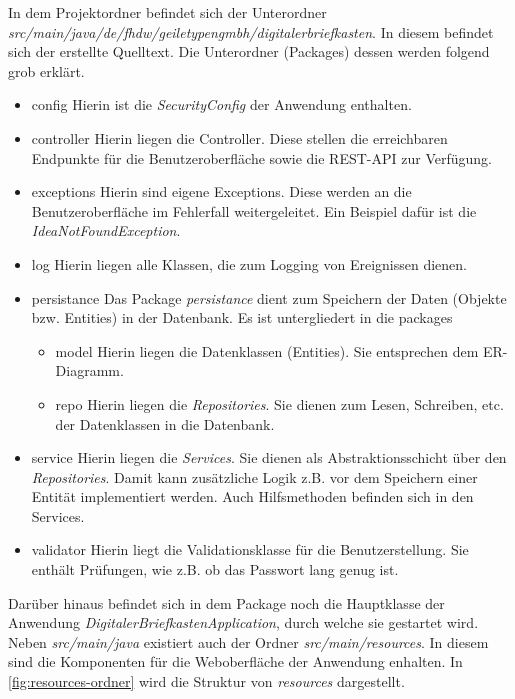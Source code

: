 In dem Projektordner befindet sich der Unterordner \textit{src/main/java/de/fhdw/geiletypengmbh/digitalerbriefkasten}. In diesem
befindet sich der erstellte Quelltext. Die Unterordner (Packages) dessen werden folgend grob erklärt.
\begin{itemize}
    \item config
    \subitem Hierin ist die \textit{SecurityConfig} der Anwendung enthalten.
    \item controller
    \subitem Hierin liegen die Controller. Diese stellen die erreichbaren Endpunkte für die Benutzeroberfläche sowie die REST-API zur Verfügung.
    \item exceptions
    \subitem Hierin sind eigene Exceptions. Diese werden an die Benutzeroberfläche im Fehlerfall weitergeleitet. Ein Beispiel dafür ist die \textit{IdeaNotFoundException}.
    \item log
    \subitem Hierin liegen alle Klassen, die zum Logging von Ereignissen dienen.
    \item persistance
    \subitem Das Package \textit{persistance} dient zum Speichern der Daten (Objekte bzw. Entities) in der Datenbank. Es ist untergliedert
    in die packages
    \begin{itemize}
        \item model
        \subitem Hierin liegen die Datenklassen (Entities). Sie entsprechen dem ER-Diagramm.
        \item repo
        \subitem Hierin liegen die \textit{Repositories}. Sie dienen zum Lesen, Schreiben, etc. der Datenklassen in die Datenbank.
    \end{itemize}
    \item service
    \subitem Hierin liegen die \textit{Services}. Sie dienen als Abstraktionsschicht über den \textit{Repositories}. Damit kann zusätzliche Logik z.B. vor dem Speichern einer Entität implementiert werden. Auch Hilfsmethoden befinden sich in den Services.
    \item validator
    \subitem Hierin liegt die Validationsklasse für die Benutzerstellung. Sie enthält Prüfungen, wie z.B. ob das Passwort lang genug ist.
\end{itemize}
Darüber hinaus befindet sich in dem Package noch die Hauptklasse der Anwendung \textit{DigitalerBriefkastenApplication}, durch welche sie gestartet wird.
\newline
Neben \textit{src/main/java} existiert auch der Ordner \textit{src/main/resources}. In diesem sind die Komponenten für die Weboberfläche der Anwendung enhalten.
In \cref{fig:resources-ordner} wird die Struktur von \textit{resources} dargestellt.

